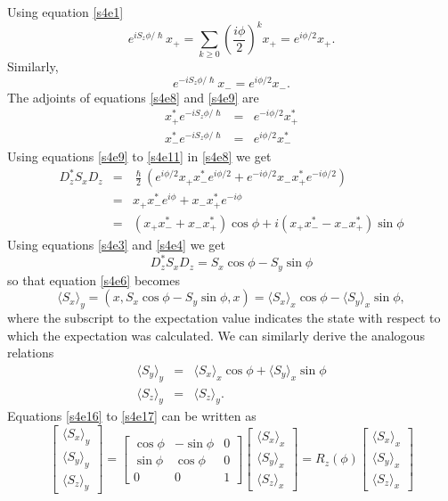 \documentclass{article}
\numberwithin{equation}{section}
\newcommand{\qev}[1]{\langle #1 \rangle} %
\theoremstyle{plain}
\numberwithin{thm}{section}
\theoremstyle{plain}
\numberwithin{prop}{section}
\theoremstyle{definition}
\numberwithin{defn}{section}
\theoremstyle{remark}
\begin{document}
Using equation \eqref{s4e1}
\begin{equation}\label{s4e10}
e^{iS_z\phi/\hslash}x_+ = 
\sum_{k \ge 0}\left(\frac{i\phi}{2}\right)^k x_+ = e^{i\phi/2}x_+.
\end{equation}
Similarly,
\begin{equation}\label{s4e11}
e^{-iS_z\phi/\hslash}x_- = e^{i\phi/2}x_-.
\end{equation}
The adjoints of equations \eqref{s4e8} and \eqref{s4e9} are
\begin{eqnarray}
x_+^\ast e^{-iS_z\phi/\hslash} &=& e^{-i\phi/2}x_+^\ast \label{s4e12} \\
x_-^\ast e^{-iS_z\phi/\hslash} &=& e^{i\phi/2}x_-^\ast \label{s4e13}
\end{eqnarray}
Using equations \eqref{s4e9} to \eqref{s4e11} in \eqref{s4e8} we get
\begin{eqnarray}
D_z^\ast S_x D_z &=& \frac{\hslash}{2}\left(e^{i\phi/2}x_+x_-^\ast e^{i\phi/2}
+ e^{-i\phi/2}x_-x_+^\ast e^{-i\phi/2}\right) \nonumber \\
 &=& x_+x_-^\ast e^{i\phi} + x_-x_+^\ast e^{-i\phi} \nonumber \\
 &=& (x_+x_-^\ast + x_-x_+^\ast)\cos\phi + i(x_+x_-^\ast - x_-x_+^\ast)\sin\phi
\label{s4e14}
\end{eqnarray}
Using equations \eqref{s4e3} and \eqref{s4e4} we get
\begin{equation}\label{s4e15}
D_z^\ast S_x D_z = S_x\cos\phi - S_y\sin\phi
\end{equation}
so that equation \eqref{s4e6} becomes
\begin{equation}\label{s4e16}
\qev{S_x}_y = (x, S_x\cos\phi - S_y\sin\phi, x) = \qev{S_x}_x\cos\phi -
\qev{S_y}_x\sin\phi,
\end{equation}
where the subscript to the expectation value indicates the state with respect
to which the expectation was calculated. We can similarly derive the analogous 
relations
\begin{eqnarray}
\qev{S_y}_y &=& \qev{S_x}_x\cos\phi + \qev{S_y}_x\sin\phi \label{s4e17} \\
\qev{S_z}_y &=& \qev{S_z}_y. \label{s4e18}
\end{eqnarray}
Equations \eqref{s4e16} to \eqref{s4e17} can be written as
\begin{equation}\label{s4e19}
\begin{bmatrix}\qev{S_x}_y \\ \qev{S_y}_y \\ \qev{S_z}_y\end{bmatrix}
= \begin{bmatrix}\cos\phi & -\sin\phi & 0 \\
\sin\phi & \cos\phi & 0 \\
0 & 0 & 1\end{bmatrix}
\begin{bmatrix}\qev{S_x}_x \\ \qev{S_y}_x \\ \qev{S_z}_x\end{bmatrix} =
R_z(\phi)\begin{bmatrix}\qev{S_x}_x \\ \qev{S_y}_x \\ \qev{S_z}_x\end{bmatrix}
\end{equation}
\end{document}
